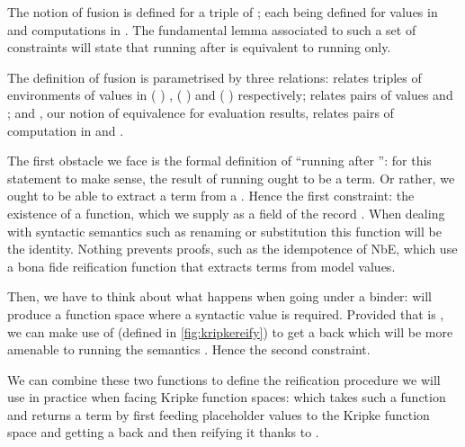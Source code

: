 The notion of fusion is defined for a triple of ; each 
being defined for values in  and computations in . The
fundamental lemma associated to such a set of constraints will state that
running  after  is equivalent to running  only.

The definition of fusion is parametrised by three relations:  relates
triples of environments of values in {( )  },
{( )  } and {( )  }
respectively;  relates pairs of values  and ;
and , our notion of equivalence for evaluation results, relates pairs
of computation in  and .


The first obstacle we face is the formal definition of ``running 
after '': for this statement to make sense, the result of running
 ought to be a term. Or rather, we ought to be able to extract a
term from a . Hence the first constraint: the existence of a
 function, which we supply as a field of the record .
When dealing with syntactic semantics such as renaming or substitution
this function will be the identity. Nothing prevents proofs, such as the
idempotence of NbE, which use a bona fide reification function that extracts
terms from model values.


Then, we have to think about what happens when going under a binder: 
will produce a  function space where a syntactic value is required.
Provided that  is , we can make use of 
(defined in \cref{fig:kripkereify}) to get a
 back which will be more amenable to running the semantics .
Hence the second constraint.


We can combine these two functions to define the reification procedure we will
use in practice when facing Kripke function spaces:  which takes such
a function and returns a term by first feeding placeholder values to the Kripke
function space and getting a  back and then reifying it thanks to .



